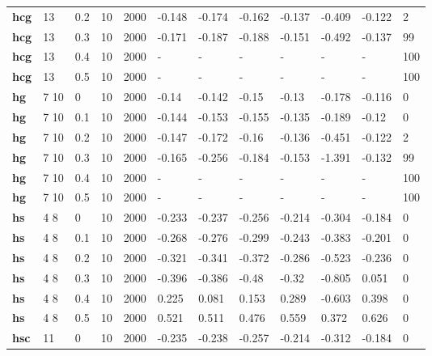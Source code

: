 \begin{longtable}[h]{|p{0.8cm}|p{1.5cm}|p{1cm}|p{1cm}|p{1cm}|p{1cm}|p{1cm}|p{1cm}|p{1cm}|p{1cm}|p{1cm}|p{1.5cm}|}
           \\
  \textbf{hcg } &  13         & 0.2 & 10 & 2000 & -0.148 & -0.174 & -0.162 & -0.137 & -0.409 & -0.122 &   2
           \\
  \textbf{hcg } &  13         & 0.3 & 10 & 2000 & -0.171 & -0.187 & -0.188 & -0.151 & -0.492 & -0.137 &  99
           \\
  \textbf{hcg } &  13         & 0.4 & 10 & 2000 & - & - & - & - & - & - & 100
           \\
  \textbf{hcg } &  13         & 0.5 & 10 & 2000 & - & - & - & - & - & - & 100
           \\
  \textbf{hg  } &  7 10       &   0 & 10 & 2000 &  -0.14 & -0.142 &  -0.15 &  -0.13 & -0.178 & -0.116 &   0
           \\
  \textbf{hg  } &  7 10       & 0.1 & 10 & 2000 & -0.144 & -0.153 & -0.155 & -0.135 & -0.189 &  -0.12 &   0
           \\
  \textbf{hg  } &  7 10       & 0.2 & 10 & 2000 & -0.147 & -0.172 &  -0.16 & -0.136 & -0.451 & -0.122 &   2
           \\
  \textbf{hg  } &  7 10       & 0.3 & 10 & 2000 & -0.165 & -0.256 & -0.184 & -0.153 & -1.391 & -0.132 &  99
           \\
  \textbf{hg  } &  7 10       & 0.4 & 10 & 2000 & - & - & - & - & - & - & 100
           \\
  \textbf{hg  } &  7 10       & 0.5 & 10 & 2000 & - & - & - & - & - & - & 100
           \\
  \textbf{hs  } &  4 8        &   0 & 10 & 2000 & -0.233 & -0.237 & -0.256 & -0.214 & -0.304 & -0.184 &   0
           \\
  \textbf{hs  } &  4 8        & 0.1 & 10 & 2000 & -0.268 & -0.276 & -0.299 & -0.243 & -0.383 & -0.201 &   0
           \\
  \textbf{hs  } &  4 8        & 0.2 & 10 & 2000 & -0.321 & -0.341 & -0.372 & -0.286 & -0.523 & -0.236 &   0
           \\
  \textbf{hs  } &  4 8        & 0.3 & 10 & 2000 & -0.396 & -0.386 &  -0.48 &  -0.32 & -0.805 &  0.051 &   0
           \\
  \textbf{hs  } &  4 8        & 0.4 & 10 & 2000 &  0.225 &  0.081 &  0.153 &  0.289 & -0.603 &  0.398 &   0
           \\
  \textbf{hs  } &  4 8        & 0.5 & 10 & 2000 &  0.521 &  0.511 &  0.476 &  0.559 &  0.372 &  0.626 &   0
           \\
  \textbf{hsc } &  11         &   0 & 10 & 2000 & -0.235 & -0.238 & -0.257 & -0.214 & -0.312 & -0.184 &   0

\end{longtable}
